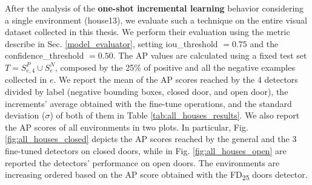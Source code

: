 After the analysis of the \textbf{one-shot incremental learning} behavior considering a single environment (\textsf{house13}), we evaluate such a technique on the entire visual dataset collected in this thesis. We perform their  evaluation using the metric describe in Sec. \ref{model_evaluator}, setting \textsf{iou\_threshold} $= 0.75$ and the \textsf{confidence\_threshold} $= 0.50$. The AP values are calculated using a fixed test set $T = S^{P}_{e, 4} \cup S^{N}_{e}$, composed by the 25\% of positive and all the negative examples collected in $e$.  We report the mean of the AP scores reached by the 4 detectors divided by label (negative bounding boxes, closed door, and open door), the increments' average obtained with the fine-tune operations, and the standard deviation ($\sigma$) of both of them in Table \ref{tab:all_houses_results}. We also report the AP scores of all environments in two plots. In particular, Fig. \ref{fig:all_houses_closed} depicts the AP scores reached by the general and the 3 fine-tuned detectors on closed doors, while in Fig. \ref{fig:all_houses_open} are reported the detectors' performance on open doors. The environments are increasing ordered based on the AP score obtained with the \textsf{FD\textsubscript{25}} doors detector.

